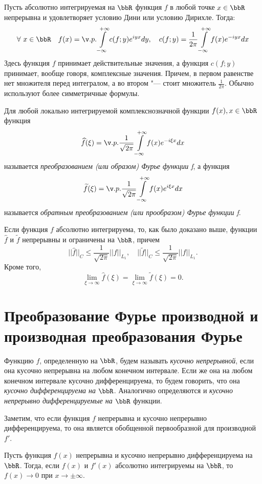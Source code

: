 Пусть абсолютно интегрируемая на $\bbR$ функция $f$ в любой точке $x \in \bbR$ непрерывна и удовлетворяет условию Дини или условию Дирихле. Тогда:
$$
\forall\ x \in \bbR\quad f(x) = \v.p.\int\limits_{-\infty}^{+\infty} c(f;y)e^{iyx}dy,\quad c(f;y)=\frac{1}{2\pi}\int\limits_{-\infty}^{+\infty} f(x)e^{-iyx}dx
$$
Здесь функция $f$ принимает действительные значения, а функция $c(f;y)$ принимает, вообще говоря, комплексные значения. Причем, в первом равенстве нет множителя перед интегралом, а во втором "--- стоит множитель $\frac{1}{2\pi}$. Обычно используют более симметричные формулы.
\begin{defn}
Для любой локально интегрируемой комплекснозначной функции $f(x), x \in \bbR$ функция
$$
\widehat{f}(\xi) = \v.p.\frac{1}{\sqrt{2\pi}} \int\limits_{-\infty}^{+\infty} f(x)e^{-i\xi x}dx
$$
называется \textit{преобразованием (или образом) Фурье функции f}, а функция
$$
\widetilde{f}(\xi) = \v.p.\frac{1}{\sqrt{2\pi}} \int\limits_{-\infty}^{+\infty} f(x)e^{i\xi x}dx
$$
называется \textit{обратным преобразованием (или прообразом) Фурье функции f}.
\end{defn}
Если функция $f$ абсолютно интегрируема, то, как было доказано выше, функции $\widehat{f}$ и $\widetilde{f}$ непрерывны и ограничены на $\bbR$, причем
$$
||\widehat{f}||_C \le \frac{1}{\sqrt{2\pi}}||f||_{L_1}, \quad ||\widetilde{f}||_C \le \frac{1}{\sqrt{2\pi}}||f||_{L_1}.
$$
Кроме того,
$$
\lim_{\xi \to \infty} \widehat{f}(\xi) = \lim_{\xi \to \infty} \widetilde{f}(\xi) = 0.
$$

\section{Преобразование Фурье производной и производная преобразования Фурье}

Функцию $f$, определенную на $\bbR$, будем называть \textit{кусочно непрерывной}, если она кусочно непрерывна на любом конечном интервале. Если же она на любом конечном интервале кусочно дифференцируема, то будем говорить, что она \textit{кусочно дифференцируема на $\bbR$}. Аналогично определяются и \textit{кусочно непрерывно дифференцируемые на $\bbR$} функции. 

Заметим, что если функция $f$ непрерывна и кусочно непрерывно дифференцируема, то она является обобщенной первообразной для производной $f'$.

\begin{lemm}
Пусть функция $f(x)$ непрерывна и кусочно непрерывно дифференцируема на $\bbR$. Тогда, если $f(x)$ и $f'(x)$ абсолютно интегрируемы на $\bbR$, то $f(x)\to 0$ при $x\to\pm\infty$.
\end{lemm}

